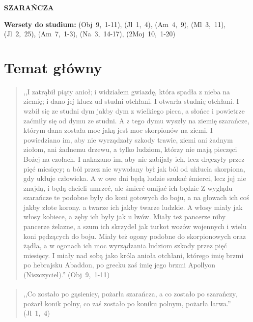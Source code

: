 \documentclass[10pt,a4paper,oneside]{article}
\begin{document}
\centerline{\textbf{\MakeUppercase{Szarańcza}}}
\begin{center}
\textbf{Wersety do studium:} \mbox{(Obj 9, 1-11)}, \mbox{(Jl 1, 4)}, \mbox{(Am 4, 9)}, \mbox{(Ml 3, 11)}, \mbox{(Jl 2, 25)}, \mbox{(Am 7, 1-3)}, \mbox{(Na 3, 14-17)}, \mbox{(2Moj 10, 1-20)}
\end{center}
\section{Temat główny}
\paragraph{}
\begin{quote}
,,I zatrąbił piąty anioł; i widziałem gwiazdę, która spadła z nieba na ziemię; i dano jej klucz ud studni otchłani. I otwarła studnię otchłani. I wzbił się ze studni dym jakby dym z wielkiego pieca, a słońce i powietrze zaćmiły się od dymu ze studni. A z tego dymu wyszły na ziemię szarańcze, którym dana została moc jaką jest moc skorpionów na ziemi. I powiedziano im, aby nie wyrządzały szkody trawie, ziemi ani żadnym ziołom, ani żadnemu drzewu, a tylko ludziom, którzy nie mają pieczęci Bożej na czołach. I nakazano im, aby nie zabijały ich, lecz dręczyły przez pięć miesięcy; a ból przez nie wywołany był jak ból od ukłucia skorpiona, gdy ukłuje człowieka. A w owe dni będą ludzie szukać śmierci, lecz jej nie znajdą, i będą chcieli umrzeć, ale śmierć omijać ich będzie Z wyglądu szarańcze te podobne były do koni gotowych do boju, a na głowach ich coś jakby złote korony. a twarze ich jakby twarze ludzkie. A włosy miały jak włosy kobiece, a zęby ich były jak u lwów. Miały też pancerze niby pancerze żelazne, a szum ich skrzydeł jak turkot wozów wojennych i wielu koni pędzących do boju. Miały też ogony podobne do skorpionowych oraz żądła, a w ogonach ich moc wyrządzania ludziom szkody przez pięć miesięcy. I miały nad sobą jako króla anioła otchłani, którego imię brzmi po hebrajsku Abaddon, po grecku zaś imię jego brzmi Apollyon (Niszczyciel).'' \mbox{(Obj 9, 1-11)}
\end{quote}
\paragraph{}
\begin{quote}
,,Co zostało po gąsienicy, pożarła szarańcza, a co zostało po szarańczy, pożarł konik polny, co zaś zostało po koniku polnym, pożarła larwa.'' \mbox{(Jl 1, 4)}
\end{quote}
\end{document}
